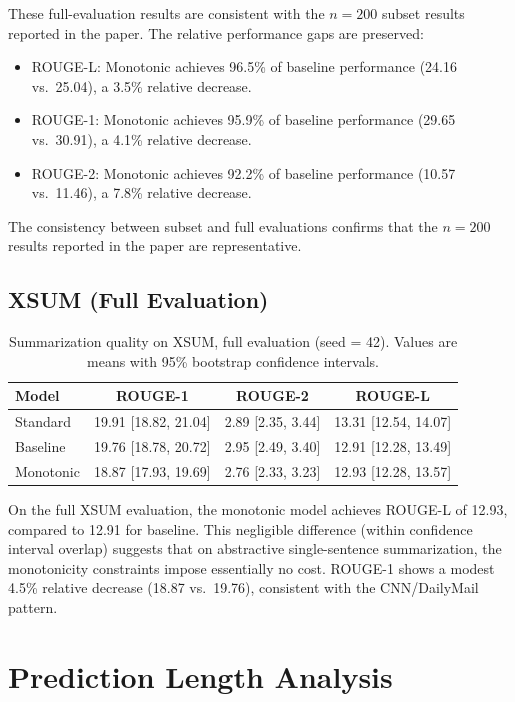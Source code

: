 \documentclass{article}
\begin{document}
These full-evaluation results are consistent with the $n=200$ subset results reported in the paper. The relative performance gaps are preserved:
\begin{itemize}
    \item ROUGE-L: Monotonic achieves 96.5\% of baseline performance (24.16 vs.\ 25.04), a 3.5\% relative decrease.
    \item ROUGE-1: Monotonic achieves 95.9\% of baseline performance (29.65 vs.\ 30.91), a 4.1\% relative decrease.
    \item ROUGE-2: Monotonic achieves 92.2\% of baseline performance (10.57 vs.\ 11.46), a 7.8\% relative decrease.
\end{itemize}

The consistency between subset and full evaluations confirms that the $n=200$ results reported in the paper are representative.

\subsection{XSUM (Full Evaluation)}

\begin{table}[h]
\caption{Summarization quality on XSUM, full evaluation (seed = 42). Values are means with 95\% bootstrap confidence intervals.}
\label{tab:full-xsum}
\centering
\begin{tabular}{lccc}
\toprule
Model & ROUGE-1 & ROUGE-2 & ROUGE-L \\
\midrule
Standard  & 19.91 [18.82, 21.04] & 2.89 [2.35, 3.44] & 13.31 [12.54, 14.07] \\
Baseline  & 19.76 [18.78, 20.72] & 2.95 [2.49, 3.40] & 12.91 [12.28, 13.49] \\
Monotonic & 18.87 [17.93, 19.69] & 2.76 [2.33, 3.23] & 12.93 [12.28, 13.57] \\
\bottomrule
\end{tabular}
\end{table}

On the full XSUM evaluation, the monotonic model achieves ROUGE-L of 12.93, compared to 12.91 for baseline. This negligible difference (within confidence interval overlap) suggests that on abstractive single-sentence summarization, the monotonicity constraints impose essentially no cost. ROUGE-1 shows a modest 4.5\% relative decrease (18.87 vs.\ 19.76), consistent with the CNN/DailyMail pattern.


\section{Prediction Length Analysis}
\label{sec:length-analysis}
\end{document}
